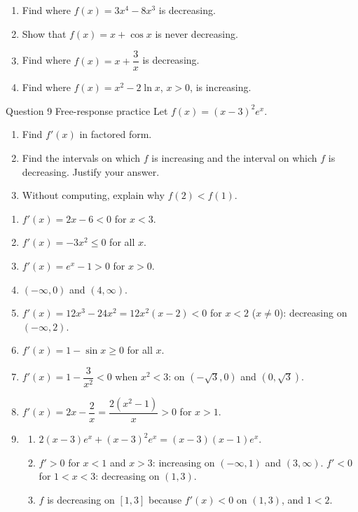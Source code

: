 \documentclass[11pt]{article}
\begin{document}
\begin{enumerate}[leftmargin=*,itemsep=2pt,start=5]
  \item Find where $f(x)=3x^4-8x^3$ is decreasing.\work{2.8cm}
  \item Show that $f(x)=x+\cos x$ is never decreasing.\work{2.8cm}
  \item Find where $f(x)=x+\dfrac3x$ is decreasing.\work{2.8cm}
  \item Find where $f(x)=x^2-2\ln x$, $x>0$, is increasing.\work{2.8cm}
\end{enumerate}

\begin{frbox}{Question 9 \textperiodcentered{} Free-response practice}
Let $f(x)=(x-3)^2e^{x}$.
\begin{enumerate}[label=(\alph*),leftmargin=*,itemsep=2pt]
  \item Find $f'(x)$ in factored form.\work{2.6cm}
  \item Find the intervals on which $f$ is increasing and the interval on which $f$ is decreasing. Justify your answer.\work{2.6cm}
  \item Without computing, explain why $f(2)<f(1)$.\work{2.6cm}
\end{enumerate}
\end{frbox}

\newpage
\begin{solbox}
\begin{enumerate}[leftmargin=*,itemsep=4pt]
  \item $f'(x)=2x-6<0$ for $x<3$.
  \item $f'(x)=-3x^2\le0$ for all $x$.
  \item $f'(x)=e^{x}-1>0$ for $x>0$.
  \item $(-\infty,0)$ and $(4,\infty)$.
  \item $f'(x)=12x^3-24x^2=12x^2(x-2)<0$ for $x<2$ ($x\neq0$): decreasing on $(-\infty,2)$.
  \item $f'(x)=1-\sin x\ge0$ for all $x$.
  \item $f'(x)=1-\dfrac{3}{x^2}<0$ when $x^2<3$: on $\left(-\sqrt3,0\right)$ and $\left(0,\sqrt3\right)$.
  \item $f'(x)=2x-\dfrac2x=\dfrac{2(x^2-1)}{x}>0$ for $x>1$.
  \item \begin{enumerate}[label=(\alph*),leftmargin=*,itemsep=3pt]
    \item $2(x-3)e^{x}+(x-3)^2e^{x}=(x-3)(x-1)e^{x}$.
    \item $f'>0$ for $x<1$ and $x>3$: increasing on $(-\infty,1)$ and $(3,\infty)$. $f'<0$ for $1<x<3$: decreasing on $(1,3)$.
    \item $f$ is decreasing on $[1,3]$ because $f'(x)<0$ on $(1,3)$, and $1<2$.
  \end{enumerate}
\end{enumerate}
\end{solbox}
\end{document}

